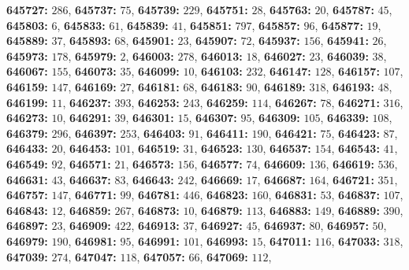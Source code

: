 \textsf{\bfseries 645727:} $286$, \textsf{\bfseries 645737:} $75$, \textsf{\bfseries 645739:} $229$, \textsf{\bfseries 645751:} $28$, \textsf{\bfseries 645763:} $20$, \textsf{\bfseries 645787:} $45$, \textsf{\bfseries 645803:} $6$, \textsf{\bfseries 645833:} $61$, \textsf{\bfseries 645839:} $41$, \textsf{\bfseries 645851:} $797$, \textsf{\bfseries 645857:} $96$, \textsf{\bfseries 645877:} $19$, \textsf{\bfseries 645889:} $37$, \textsf{\bfseries 645893:} $68$, \textsf{\bfseries 645901:} $23$, \textsf{\bfseries 645907:} $72$, \textsf{\bfseries 645937:} $156$, \textsf{\bfseries 645941:} $26$, \textsf{\bfseries 645973:} $178$, \textsf{\bfseries 645979:} $2$, \textsf{\bfseries 646003:} $278$, \textsf{\bfseries 646013:} $18$, \textsf{\bfseries 646027:} $23$, \textsf{\bfseries 646039:} $38$, \textsf{\bfseries 646067:} $155$, \textsf{\bfseries 646073:} $35$, \textsf{\bfseries 646099:} $10$, \textsf{\bfseries 646103:} $232$, \textsf{\bfseries 646147:} $128$, \textsf{\bfseries 646157:} $107$, \textsf{\bfseries 646159:} $147$, \textsf{\bfseries 646169:} $27$, \textsf{\bfseries 646181:} $68$, \textsf{\bfseries 646183:} $90$, \textsf{\bfseries 646189:} $318$, \textsf{\bfseries 646193:} $48$, \textsf{\bfseries 646199:} $11$, \textsf{\bfseries 646237:} $393$, \textsf{\bfseries 646253:} $243$, \textsf{\bfseries 646259:} $114$, \textsf{\bfseries 646267:} $78$, \textsf{\bfseries 646271:} $316$, \textsf{\bfseries 646273:} $10$, \textsf{\bfseries 646291:} $39$, \textsf{\bfseries 646301:} $15$, \textsf{\bfseries 646307:} $95$, \textsf{\bfseries 646309:} $105$, \textsf{\bfseries 646339:} $108$, \textsf{\bfseries 646379:} $296$, \textsf{\bfseries 646397:} $253$, \textsf{\bfseries 646403:} $91$, \textsf{\bfseries 646411:} $190$, \textsf{\bfseries 646421:} $75$, \textsf{\bfseries 646423:} $87$, \textsf{\bfseries 646433:} $20$, \textsf{\bfseries 646453:} $101$, \textsf{\bfseries 646519:} $31$, \textsf{\bfseries 646523:} $130$, \textsf{\bfseries 646537:} $154$, \textsf{\bfseries 646543:} $41$, \textsf{\bfseries 646549:} $92$, \textsf{\bfseries 646571:} $21$, \textsf{\bfseries 646573:} $156$, \textsf{\bfseries 646577:} $74$, \textsf{\bfseries 646609:} $136$, \textsf{\bfseries 646619:} $536$, \textsf{\bfseries 646631:} $43$, \textsf{\bfseries 646637:} $83$, \textsf{\bfseries 646643:} $242$, \textsf{\bfseries 646669:} $17$, \textsf{\bfseries 646687:} $164$, \textsf{\bfseries 646721:} $351$, \textsf{\bfseries 646757:} $147$, \textsf{\bfseries 646771:} $99$, \textsf{\bfseries 646781:} $446$, \textsf{\bfseries 646823:} $160$, \textsf{\bfseries 646831:} $53$, \textsf{\bfseries 646837:} $107$, \textsf{\bfseries 646843:} $12$, \textsf{\bfseries 646859:} $267$, \textsf{\bfseries 646873:} $10$, \textsf{\bfseries 646879:} $113$, \textsf{\bfseries 646883:} $149$, \textsf{\bfseries 646889:} $390$, \textsf{\bfseries 646897:} $23$, \textsf{\bfseries 646909:} $422$, \textsf{\bfseries 646913:} $37$, \textsf{\bfseries 646927:} $45$, \textsf{\bfseries 646937:} $80$, \textsf{\bfseries 646957:} $50$, \textsf{\bfseries 646979:} $190$, \textsf{\bfseries 646981:} $95$, \textsf{\bfseries 646991:} $101$, \textsf{\bfseries 646993:} $15$, \textsf{\bfseries 647011:} $116$, \textsf{\bfseries 647033:} $318$, \textsf{\bfseries 647039:} $274$, \textsf{\bfseries 647047:} $118$, \textsf{\bfseries 647057:} $66$, \textsf{\bfseries 647069:} $112$, 
